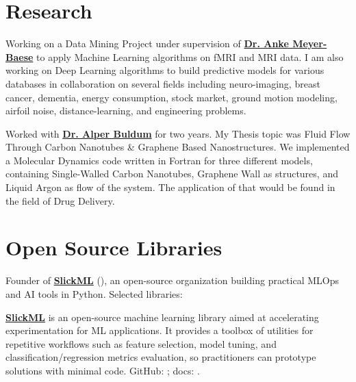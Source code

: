 \documentclass[]{template}
\begin{document}
\section{Research}
\sectionsep
{}
Working on a Data Mining Project under supervision of  \textbf{\href{https://people.sc.fsu.edu/~ameyerbaese/}{Dr. Anke Meyer-Baese}} to apply Machine Learning algorithms on fMRI and MRI data. I am also working on Deep Learning algorithms to build predictive models for various databases in collaboration on several fields including neuro-imaging, breast cancer, dementia, energy consumption, stock market, ground motion modeling, airfoil noise, distance-learning, and engineering problems.

\sectionsep

Worked with \textbf{\href{https://www.uakron.edu/physics/faculty-staff/bio-detail.dot?u=buldum}{Dr. Alper Buldum}} for two years. My Thesis topic was Fluid Flow Through Carbon Nanotubes \& Graphene Based Nanostructures. We implemented a Molecular Dynamics code written in Fortran for three different models, containing Single-Walled Carbon Nanotubes, Graphene Wall as structures, and Liquid Argon as flow of the system. The application of that would be found in the field of Drug Delivery.
\sectionsep
\hline
\sectionsep
\section{Open Source Libraries}
\sectionsep
Founder of \textbf{\href{https://github.com/slickml}{SlickML}} (), an open-source organization building practical MLOps and AI tools in Python. Selected libraries:

\sectionsep
{}
\textbf{\href{https://github.com/slickml/slick-ml}{SlickML}} is an open-source machine learning library aimed at accelerating experimentation for ML applications. It provides a toolbox of utilities for repetitive workflows such as feature selection, model tuning, and classification/regression metrics evaluation, so practitioners can prototype solutions with minimal code. GitHub: ; docs: .
\end{document}
